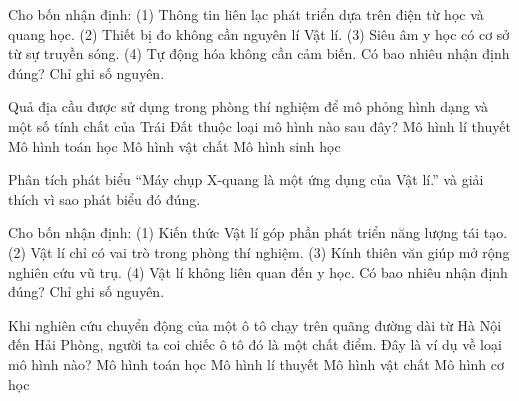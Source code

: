 \begin{ex}
Cho bốn nhận định: (1) Thông tin liên lạc phát triển dựa trên điện từ học và quang học. (2) Thiết bị đo không cần nguyên lí Vật lí. (3) Siêu âm y học có cơ sở từ sự truyền sóng. (4) Tự động hóa không cần cảm biến. Có bao nhiêu nhận định đúng? Chỉ ghi số nguyên.
\end{ex}

\begin{ex}
Quả địa cầu được sử dụng trong phòng thí nghiệm để mô phỏng hình dạng và một số tính chất của Trái Đất thuộc loại mô hình nào sau đây?
\choice
{Mô hình lí thuyết}
{Mô hình toán học}
{\True Mô hình vật chất}
{Mô hình sinh học}
\end{ex}


\begin{bt}
Phân tích phát biểu “Máy chụp X-quang là một ứng dụng của Vật lí.” và giải thích vì sao phát biểu đó đúng.
\end{bt}

\begin{ex}
Cho bốn nhận định: (1) Kiến thức Vật lí góp phần phát triển năng lượng tái tạo. (2) Vật lí chỉ có vai trò trong phòng thí nghiệm. (3) Kính thiên văn giúp mở rộng nghiên cứu vũ trụ. (4) Vật lí không liên quan đến y học. Có bao nhiêu nhận định đúng? Chỉ ghi số nguyên.
\end{ex}

\begin{ex}
Khi nghiên cứu chuyển động của một ô tô chạy trên quãng đường dài từ Hà Nội đến Hải Phòng, người ta coi chiếc ô tô đó là một chất điểm. Đây là ví dụ về loại mô hình nào?
\choice
{Mô hình toán học}
{\True Mô hình lí thuyết}
{Mô hình vật chất}
{Mô hình cơ học}
\end{ex}

